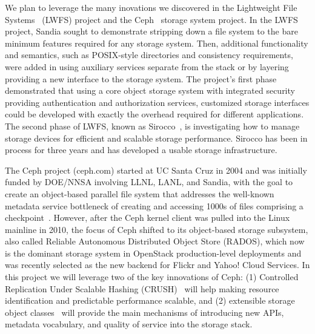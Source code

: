 We plan to leverage the many inovations we discovered in the Lightweight File
Systems~\cite{lwfs} (LWFS) project and the Ceph~\cite{weil:osdi06} storage
system project.  In the LWFS project, Sandia sought to demonstrate stripping
down a file system to the bare minimum features required for any storage
system. Then, additional functionality and semantics, such as POSIX-style
directories and consistency requirements, were added in using auxiliary
services separate from the stack or by layering providing a new interface to
the storage system. The project's first phase demonstrated that using a core
object storage system with integrated security providing authentication and
authorization services, customized storage interfaces could be developed with
exactly the overhead required for different applications. The second phase of
LWFS, known as Sirocco~\cite{sirocco}, is investigating how to manage storage
devices for efficient and scalable storage performance.  Sirocco has been in
process for three years and has developed a usable storage infrastructure.

The Ceph project (ceph.com) started at UC Santa Cruz in 2004 and was initially
funded by DOE/NNSA involving LLNL, LANL, and Sandia, with the goal to create an
object-based parallel file system that addresses the well-known metadata
service bottleneck of creating and accessing 1000s of files comprising a
checkpoint~\cite{weil:osdi06}.  However, after the Ceph kernel client was
pulled into the Linux mainline in 2010, the focus of Ceph shifted to its
object-based storage subsystem, also called Reliable Autonomous Distributed
Object Store (RADOS), which now is the dominant storage system in OpenStack
production-level deployments and was recently selected as the new backend for
Flickr and Yahoo! Cloud Services. In this project we will leverage two of the
key innovations of Ceph: (1) Controlled Replication Under Scalable Hashing
(CRUSH)~\cite{weil:sc06} will help making resource identification and
predictable performance scalable, and (2) extensible storage object
classes~\cite{watkins:ucsctr15} will provide the main mechanisms of introducing
new APIs, metadata vocabulary, and quality of service into the storage stack.

